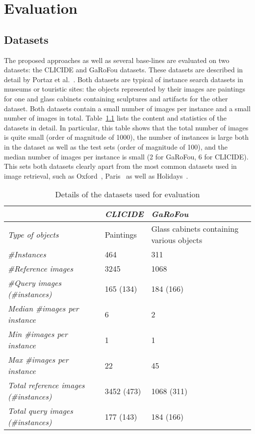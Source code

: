 
\chapter{Evaluation}\label{sec:evaluation}
\section{Datasets}\label{sec:datasets}
The proposed approaches as well as several base-lines are evaluated
on two datasets: the CLICIDE and GaRoFou datasets. These datasets are
described in detail by Portaz et al.~\cite{portaz_construction_nodate}.
Both datasets are typical of instance search datasets
in museums or touristic sites: the objects represented by their images
are paintings for one and glass cabinets containing sculptures and artifacts
for the other dataset. Both datasets contain a small number of images
per instance and a small number of images in total.
Table~\ref{tab:datasets} lists the content and statistics of the datasets
in detail. In particular, this table shows that the total number of images
is quite small (order of magnitude of 1000), the number of instances
is large both in the dataset as well as the test sets (order of magnitude
of 100), and the median number of images per instance is small
(2 for GaRoFou, 6 for CLICIDE). This sets both datasets clearly apart
from the most common datasets used in image retrieval, such as
Oxford~\cite{philbin_object_2007}, Paris~\cite{philbin_lost_2008}
as well as Holidays~\cite{jegou_hamming_2008}.

\begin{table}
\begin{tabular}{|l|l|l|}
\hline & \emph{CLICIDE} & \emph{GaRoFou}\\
\hline \emph{Type of objects} & Paintings & Glass cabinets
containing various objects\\
\hline \emph{\#Instances} & 464 & 311\\
\hline \emph{\#Reference images} & 3245 & 1068\\
\hline \emph{\#Query images (\#instances)} & 165 (134) & 184 (166)\\
\hline \emph{Median \#images per instance} & 6 & 2\\
\hline \emph{Min \#images per instance} & 1 & 1\\
\hline \emph{Max \#images per instance} & 22 & 45\\
\hline \emph{Total reference images (\#instances)} & 3452 (473) & 1068 (311)\\
\hline \emph{Total query images (\#instances)} & 177 (143) & 184 (166)\\
\hline
\end{tabular}
\caption{Details of the datasets used for evaluation\label{tab:datasets}}
\end{table}

